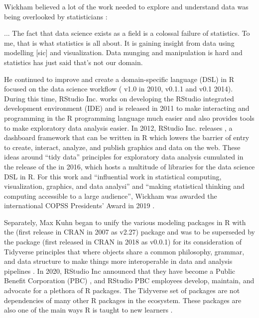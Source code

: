 \documentclass[010-intro.tex]{subfiles}
\begin{document}
        Wickham believed a lot of the work needed to explore and understand data was being overlooked by statisticians
        \cite{smithHadleyWickhamWhy2015}:
        \begin{displayquote}
            ... The fact that data science exists as a field is a colossal failure of statistics.
            To me, that is what statistics is all about.
            It is gaining insight from data using modelling [sic] and visualization.
            Data munging and manipulation is hard and statistics has just said that's not our domain.
        \end{displayquote}
        He continued to improve and create a domain-specific language (DSL) in R focused on the data science workflow
        ( v1.0 in 2010,  v0.1.1 and  v0.1 2014).
        During this time,
        RStudio Inc. works on developing the RStudio integrated development environment (IDE)
        and is released in 2011 to make interacting and programming
        in the R programming language much easier and also provides tools to make exploratory data analysis easier.
        In 2012, RStudio Inc. releases ,
        a dashboard framework that can be written in R which
        lowers the barrier of entry to create, interact, analyze, and publish graphics and data on the web.
        These ideas around ``tidy data'' principles for exploratory data analysis
        \cite{wickhamTidyData2014}
        cumulated in the release of the  in 2016,
        which hosts a multitude of libraries for the data science DSL in R.
        For this work and ``influential work in statistical computing, visualization, graphics, and data analysi'' and
        ``making statistical thinking and computing accessible to a large audience'',
        Wickham was awarded the international COPSS Presidents' Award in 2019
        \cite{InstituteMathematicalStatistics2019}.

        Separately,
        Max Kuhn began to unify the various modeling packages in R with the 
        (first release in CRAN in 2007 as v2.27) package
        and was to be superseded by
        the  package
        (first released in CRAN in 2018 as v0.0.1)
        for its consideration of Tidyverse principles that where objects share a common philosophy, grammar, and data structure
        to make things more interoperable in data and analysis pipelines
        \cite{wickhamR4ds, kuhnTidyModeling2021}.
        In 2020, RStudio Inc announced that they have become a Public Benefit Corporation (PBC)
        \cite{allaireRStudioPBC2020, rstudioRStudio},
        and RStudio PBC employees develop, maintain, and advocate for a plethora of R packages.
        The Tidyverse set of packages are not dependencies of many other R packages in the ecosystem.
        These packages are also one of the main ways R is taught to new learners
        \cite{wickhamR4ds}.
\end{document}
